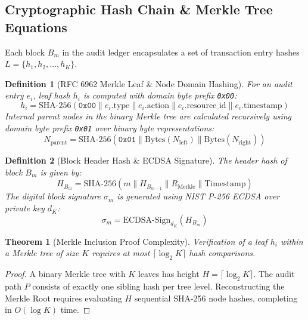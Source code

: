 \documentclass[10pt,conference,two-column]{IEEEtran}
\newtheorem{theorem}{Theorem}
\newtheorem{definition}{Definition}
\begin{document}
\begin{table}[t]
\subsection{Cryptographic Hash Chain \& Merkle Tree Equations}
Each block $B_m$ in the audit ledger encapsulates a set of transaction entry hashes $L = \{h_1, h_2, \dots, h_K\}$.

\begin{definition}[RFC 6962 Merkle Leaf & Node Domain Hashing]
For an audit entry $e_i$, leaf hash $h_i$ is computed with domain byte prefix \texttt{0x00}:
\begin{equation}
h_i = \text{SHA-256}(\texttt{0x00} \parallel e_i.\text{type} \parallel e_i.\text{action} \parallel e_i.\text{resource\_id} \parallel e_i.\text{timestamp})
\end{equation}
Internal parent nodes in the binary Merkle tree are calculated recursively using domain byte prefix \texttt{0x01} over binary byte representations:
\begin{equation}
N_{\text{parent}} = \text{SHA-256}(\texttt{0x01} \parallel \text{Bytes}(N_{\text{left}}) \parallel \text{Bytes}(N_{\text{right}}))
\end{equation}
\end{definition}

\begin{definition}[Block Header Hash & ECDSA Signature]
The header hash of block $B_m$ is given by:
\begin{equation}
H_{B_m} = \text{SHA-256}(m \parallel H_{B_{m-1}} \parallel R_{\text{Merkle}} \parallel \text{Timestamp})
\end{equation}
The digital block signature $\sigma_m$ is generated using NIST P-256 ECDSA over private key $d_K$:
\begin{equation}
\sigma_m = \text{ECDSA-Sign}_{d_K}(H_{B_m})
\end{equation}
\end{definition}

\begin{theorem}[Merkle Inclusion Proof Complexity]
Verification of a leaf $h_i$ within a Merkle tree of size $K$ requires at most $\lceil \log_2 K \rceil$ hash comparisons.
\end{theorem}
\begin{proof}
A binary Merkle tree with $K$ leaves has height $H = \lceil \log_2 K \rceil$. The audit path $P$ consists of exactly one sibling hash per tree level. Reconstructing the Merkle Root requires evaluating $H$ sequential SHA-256 node hashes, completing in $O(\log K)$ time.
\end{proof}


\end{table}
\end{document}
